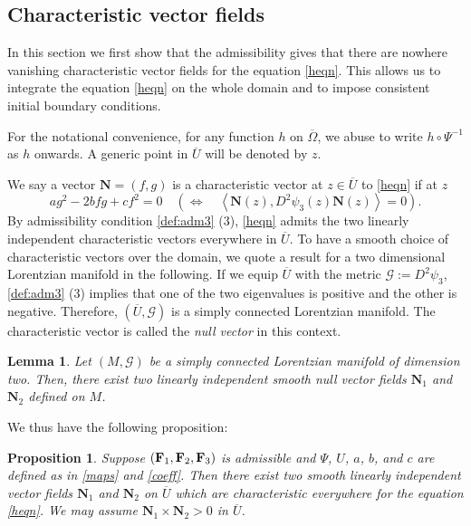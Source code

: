 \documentclass[11pt]{amsart}
\theoremstyle{plain}
\newtheorem{Prop}[Thm]{Proposition}
\newtheorem{Lem}[Thm]{Lemma}
\theoremstyle{remark}
\numberwithin{equation}{section}
\numberwithin{Thm}{section}
\def\U{\overline{U}}
\def\N{{\mathbf N}}
\def\F{{\bf F}}
\begin{document}

\subsection{Characteristic vector fields}\label{sect.char}

In this section we first show that the admissibility gives that there are nowhere vanishing characteristic vector fields for the equation \eqref{heqn}. This allows us to integrate the equation \eqref{heqn} on the whole domain and to impose consistent initial boundary conditions. 

For the notational convenience, for any function $h$ on $\overline\Omega$, we abuse to write $h\circ \Psi^{-1}$ as $h$ onwards. A generic point in $\U$ will be denoted by $z$.

We say a vector $\N=(f,g)$ is a characteristic vector at $z\in \U$ to \eqref{heqn} if at $z$
$$a g^2 - 2b fg + c f^2 = 0 \quad \left( \Longleftrightarrow \quad \left<\N(z), D^2\psi_3(z) \N(z)\right> = 0\right).$$
By admissibility condition \ref{def:adm3} (3), \eqref{heqn} admits the two linearly independent characteristic vectors everywhere in $\overline{U}$. To have a smooth choice of characteristic vectors over the domain, we quote a result for a two dimensional Lorentzian manifold in the following. If we equip $\overline U$ with the metric $\mathscr{G}:=D^2 \psi_3$, \ref{def:adm3} (3) implies that one of the two eigenvalues is positive and the other is negative. Therefore, $(\U,\mathscr{G})$ is a simply connected Lorentzian manifold. The characteristic vector is called the {\it null vector} in this context.%
\begin{Lem}\cite[Proposition 3.37]{MR1384756}\label{lemma:GHL}
Let $(M,\mathscr{G})$ be a simply connected Lorentzian manifold of dimension two. Then, there exist two linearly independent smooth null vector fields $\N_1$ and $\N_2$ defined on $M$.
\end{Lem}
We thus have the following proposition:
\begin{Prop}\label{prop:separability} Suppose $(\F_1,\F_2,\F_3)$ is admissible and $\Psi$, $U$, $a$, $b$, and $c$ are defined as in \eqref{maps} and \eqref{coeff}. Then there exist two smooth linearly independent vector fields $\N_1$ and $\N_2$ on $\overline U$ which are characteristic everywhere for the equation \eqref{heqn}. We may assume $\N_1 \times \N_2 > 0$ in $\overline U$.
\end{Prop}
\end{document}
